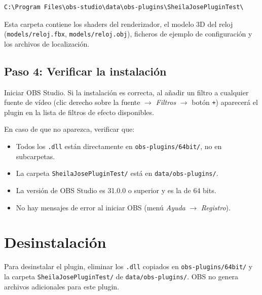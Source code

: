 \begin{verbatim}
C:\Program Files\obs-studio\data\obs-plugins\SheilaJosePluginTest\
\end{verbatim}

Esta carpeta contiene los shaders del renderizador, el modelo 3D del reloj (\texttt{models/reloj.fbx}, \texttt{models/reloj.obj}), ficheros de ejemplo de configuración y los archivos de localización.

\subsection*{Paso 4: Verificar la instalación}

Iniciar OBS Studio. Si la instalación es correcta, al añadir un filtro a cualquier fuente de vídeo (clic derecho sobre la fuente $\rightarrow$ \textit{Filtros} $\rightarrow$ botón \texttt{+}) aparecerá el plugin en la lista de filtros de efecto disponibles.

En caso de que no aparezca, verificar que:

\begin{itemize}
  \item Todos los \texttt{.dll} están directamente en \texttt{obs-plugins/64bit/}, no en subcarpetas.
  \item La carpeta \texttt{SheilaJosePluginTest/} está en \texttt{data/obs-plugins/}.
  \item La versión de OBS Studio es 31.0.0 o superior y es la de 64 bits.
  \item No hay mensajes de error al iniciar OBS (menú \textit{Ayuda} $\rightarrow$ \textit{Registro}).
\end{itemize}

\section*{Desinstalación}

Para desinstalar el plugin, eliminar los \texttt{.dll} copiados en \texttt{obs-plugins/64bit/} y la carpeta \texttt{SheilaJosePluginTest/} de \texttt{data/obs-plugins/}. OBS no genera archivos adicionales para este plugin.
